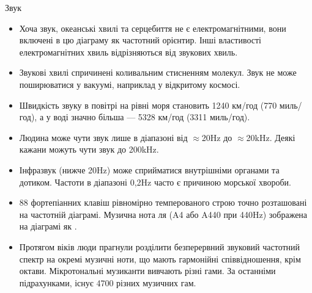 {\Large Звук}
{
%
\begin{itemize}

\item Хоча звук, океанські хвилі та серцебиття не є електромагнітними, вони включені в цю діаграму як частотний орієнтир. Інші властивості електромагнітних хвиль відрізняються від звукових хвиль.

\item Звукові хвилі спричинені коливальним стисненням молекул. Звук не може поширюватися у вакуумі, наприклад у відкритому космосі.

\item Швидкість звуку в повітрі на рівні моря становить 1240 км/год (770 миль/год), а у воді значно більша --- 5328 км/год (3311 миль/год).

\item Людина може чути звук лише в діапазоні від $\approx$20Hz до $\approx$20kHz. Деякі кажани можуть чути звук до 200kHz.

\item Інфразвук (нижче 20Hz) може сприйматися внутрішніми органами та дотиком.
%
Частоти в діапазоні 0,2Hz часто є причиною морської хвороби.


\item 88 фортепіанних клавіш рівномірно темперованого строю точно розташовані на частотній діаграмі. Музична нота ля (A4 або A440 при 440Hz) зображена на діаграмі як \pscirclebox[fillstyle=solid,fillcolor=HumanAudioColor]{\textcolor{white}{A4}}.

\item Протягом віків люди прагнули розділити безперервний звуковий частотний спектр на окремі музичні ноти, що мають гармонійні співвідношення, крім октави. Мікротональні музиканти вивчають різні гами. За останніми підрахунками, існує 4700 різних музичних гам.



\end{itemize}}
